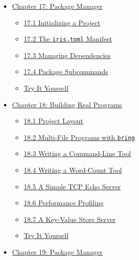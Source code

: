 \documentclass[
  english,
]{book}
\providecommand{\tightlist}{%
  \setlength{\itemsep}{0pt}\setlength{\parskip}{0pt}}
\begin{document}
\begin{itemize}
  \begin{itemize}
  \tightlist
  \item
    \hyperref[161-the-repl-in-depth]{16.1 The REPL in Depth}
  \item
    \hyperref[162-lsp-features]{16.2 LSP Features}
  \item
    \hyperref[163-the-step-debugger-dap]{16.3 The Step Debugger (DAP)}
  \item
    \hyperref[164-the-vs-code-extension]{16.4 The VS Code Extension}
  \item
    \hyperref[166-ir-inspection]{16.6 IR Inspection}
  \item
    \hyperref[165-optimization-passes]{16.5 Optimization Passes}
  \item
    \hyperref[167-subcommands--tooling-suite]{16.7 Subcommands \&
    Tooling Suite}
  \item
    \hyperref[try-it-yourself]{Try It Yourself}
  \end{itemize}
\item
  \hyperref[chapter-17-package-manager]{Chapter 17: Package Manager}

  \begin{itemize}
  \tightlist
  \item
    \hyperref[171-initializing-a-project]{17.1 Initializing a Project}
  \item
    \hyperref[172-the-iristoml-manifest]{17.2 The \texttt{iris.toml}
    Manifest}
  \item
    \hyperref[173-managing-dependencies]{17.3 Managing Dependencies}
  \item
    \hyperref[174-package-subcommands]{17.4 Package Subcommands}
  \item
    \hyperref[try-it-yourself]{Try It Yourself}
  \end{itemize}
\item
  \hyperref[chapter-18-building-real-programs]{Chapter 18: Building Real
  Programs}

  \begin{itemize}
  \tightlist
  \item
    \hyperref[181-project-layout]{18.1 Project Layout}
  \item
    \hyperref[182-multi-file-programs-with-bring]{18.2 Multi-File
    Programs with \texttt{bring}}
  \item
    \hyperref[183-writing-a-command-line-tool]{18.3 Writing a
    Command-Line Tool}
  \item
    \hyperref[184-writing-a-word-count-tool]{18.4 Writing a Word-Count
    Tool}
  \item
    \hyperref[185-a-simple-tcp-echo-server]{18.5 A Simple TCP Echo
    Server}
  \item
    \hyperref[186-performance-profiling]{18.6 Performance Profiling}
  \item
    \hyperref[187-a-key-value-store-server]{18.7 A Key-Value Store
    Server}
  \item
    \hyperref[try-it-yourself]{Try It Yourself}
  \end{itemize}
\item
  \hyperref[chapter-19-package-manager]{Chapter 19: Package Manager}


\end{itemize}
\end{document}
